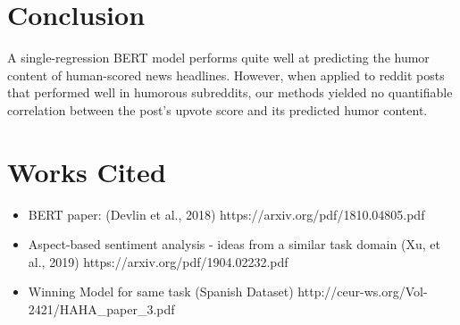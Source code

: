 \documentclass{article}
\begin{document}
\section{Conclusion}

A single-regression BERT model performs quite well at predicting the humor content of human-scored news headlines. However, when applied to reddit posts that performed well in humorous subreddits, our methods yielded no quantifiable correlation between the post's upvote score and its predicted humor content.

\section{Works Cited}
\begin{itemize}
\item BERT paper: (Devlin et al., 2018) https://arxiv.org/pdf/1810.04805.pdf
\item Aspect-based sentiment analysis - ideas from a similar task domain (Xu, et al., 2019) https://arxiv.org/pdf/1904.02232.pdf
\item Winning Model for same task (Spanish Dataset) http://ceur-ws.org/Vol-2421/HAHA\_paper\_3.pdf
\end{itemize}



\end{document}

